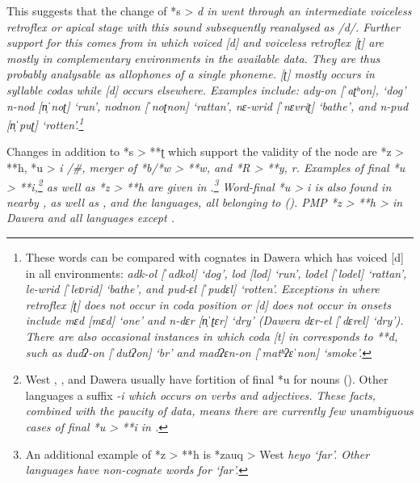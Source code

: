 This suggests that the change of *s > \it{d} in  went through an intermediate voiceless retroflex or apical
stage with this sound subsequently reanalysed as /d/.
Further support for this comes from  in which voiced [d]
and voiceless retroflex [ʈ] are mostly in complementary environments
in the available data.
They are thus probably analysable as allophones of a single phoneme.
 [ʈ] mostly occurs in syllable codas while [d] occurs elsewhere.
Examples include: \it{ady-on} [ˈaʈʰon], ‘dog’ \it{n-nod} [n̩ˈnoʈ]
‘run’, \it{nodnon} [ˈnoʈnon] ‘rattan’, \it{nɛ-wrid} [ˈnɛvriʈ] ‘bathe’,
and \it{n-pud} [n̩ˈpuʈ] ‘rotten’.\footnote{
		These  words can
		be compared with cognates in Dawera which has voiced [d] in all
		environments: \it{adk-ol} [ˈadkol] ‘dog’,
		\it{lod} [lod] ‘run’, \it{lodel} [ˈlodel] ‘rattan’,
		\it{le-wrid} [ˈleʋrid] ‘bathe’, and \it{pud-ɛl} [ˈpudɛl] ‘rotten’.
		Exceptions in  where retroflex [ʈ] does not occur in coda
		position or [d] does not occur in onsets include \it{mɛd} [mɛd]
		‘one’ and \it{n-dɛr} [n̩ˈʈɛr] ‘dry’ (Dawera \it{dɛr-el} [ˈdɛrel] ‘dry’).
		There are also occasional instances in which coda [t] in 
		corresponds to **d, such as \it{dudʔ-on} [ˈdutʔon] ‘br’
		and \it{madʔɛn-on} [ˈmatʰʔɛˈnon] ‘smoke’.}

Changes in addition to *s > **ʈ which support the validity of
the  node are *z > **h,
*u > \it{i} /{\gap\#},
merger of *b/*w > **w,
and *R > **y, \it{r}.
Examples of final *u > **i,\footnote{
		West , , and Dawera usually have fortition
		of final *u for nouns ().
		Other  languages a suffix \it{-i} which occurs on verbs and adjectives.
		These facts, combined with the paucity of data,
		means there are currently few unambiguous cases of final *u >
				**i in .}
as well as *z > **h are given in .\footnote{
		An additional example of *z > **h is *zauq > West  \it{heyo} ‘far’.
		Other  languages have non-cognate words for ‘far’.}
Word-final *u > \it{i} is also found in nearby ,
as well as ,
 and the  languages,
all belonging to 
().
PMP *z > **h > {\0} in Dawera
and all  languages except .

